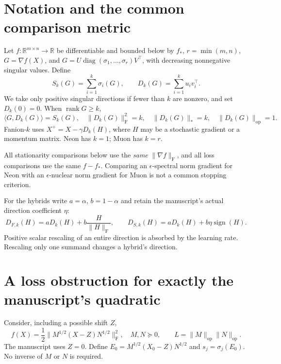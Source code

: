 \documentclass[11pt]{article}
\newcommand{\R}{\mathbb R}
\newcommand{\ip}[2]{\langle #1,#2\rangle}
\newcommand{\F}[1]{\lVert #1\rVert_{\mathrm F}}
\newcommand{\nuc}[1]{\lVert #1\rVert_*}
\newcommand{\op}[1]{\lVert #1\rVert_{\mathrm{op}}}
\newcommand{\sgn}{\operatorname{sign}}
\newcommand{\rank}{\operatorname{rank}}
\begin{document}
\section{Notation and the common comparison metric}

Let $f:\R^{m\times n}\to\R$ be differentiable and bounded below by $f_*$,
$r=\min(m,n)$, $G=\nabla f(X)$, and
$G=U\operatorname{diag}(\sigma_1,\ldots,\sigma_r)V^\top$, with decreasing
nonnegative singular values. Define
\[
 S_k(G)=\sum_{i=1}^k\sigma_i(G),\qquad
 D_k(G)=\sum_{i=1}^k u_i v_i^\top.
\]
We take only positive singular directions if fewer than $k$ are nonzero, and
set $D_k(0)=0$. When $\rank G\geq k$,
\begin{equation}\label{eq:fanion-identities}
 \ip{G}{D_k(G)}=S_k(G),\quad \F{D_k(G)}^2=k,\quad
 \nuc{D_k(G)}=k,\quad\op{D_k(G)}=1.
\end{equation}
Fanion-$k$ uses $X^+=X-\gamma D_k(H)$, where $H$ may be a stochastic gradient
or a momentum matrix. Neon has $k=1$; Muon has $k=r$.

All stationarity comparisons below use the \emph{same} $\F{\nabla f}$, and all
loss comparisons use the same $f-f_*$. Comparing an $\epsilon$-spectral norm
gradient for Neon with an $\epsilon$-nuclear norm gradient for Muon is not a
common stopping criterion.

For the hybrids write $a=\alpha$, $b=1-\alpha$ and retain the manuscript's
actual direction coefficient $\eta$:
\begin{equation}\label{eq:hybrids}
 D_{F,k}(H)=aD_k(H)+b\frac{H}{\F H},\qquad
 D_{S,k}(H)=aD_k(H)+b\eta\sgn(H).
\end{equation}
Positive scalar rescaling of an entire direction is absorbed by the learning
rate. Rescaling only one summand changes a hybrid's direction.

\section{A loss obstruction for exactly the manuscript's quadratic}

Consider, including a possible shift $Z$,
\begin{equation}\label{eq:quadratic}
 f(X)=\frac12\F{M^{1/2}(X-Z)N^{1/2}}^2,\quad M,N\succeq0,
 \qquad L=\op M\op N.
\end{equation}
The manuscript uses $Z=0$. Define $E_0=M^{1/2}(X_0-Z)N^{1/2}$ and
$s_j=\sigma_j(E_0)$. No inverse of $M$ or $N$ is required.
\end{document}

